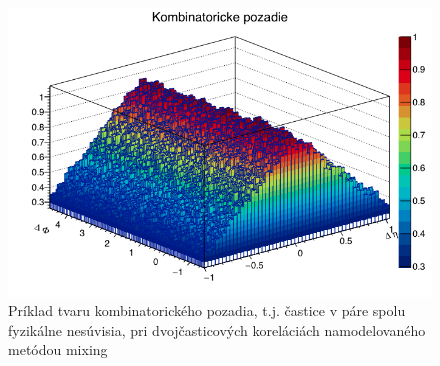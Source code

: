 \documentclass[thesismargins, thesislinespacing]{rnthesis}
\begin{document}
\begin{figure}[hbtp!]
	\centering
	\includegraphics[scale=0.5]{./Obrazky_praca/pozadie.png}
	\caption{Príklad tvaru kombinatorického pozadia, t.j. častice v páre spolu fyzikálne nesúvisia, pri dvojčasticových koreláciách namodelovaného metódou mixing}
	\label{pozadie}
\end{figure}
\end{document}
